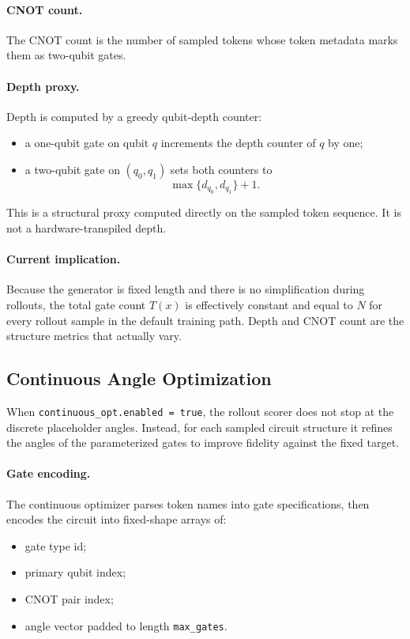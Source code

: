 \documentclass[11pt]{article}
\begin{document}
\paragraph{CNOT count.}
The CNOT count is the number of sampled tokens whose token metadata marks them as two-qubit gates.

\paragraph{Depth proxy.}
Depth is computed by a greedy qubit-depth counter:
\begin{itemize}[leftmargin=*]
\item a one-qubit gate on qubit $q$ increments the depth counter of $q$ by one;
\item a two-qubit gate on $(q_0,q_1)$ sets both counters to
\[
\max\{d_{q_0}, d_{q_1}\} + 1.
\]
\end{itemize}

This is a structural proxy computed directly on the sampled token sequence. It is not a hardware-transpiled depth.

\paragraph{Current implication.}
Because the generator is fixed length and there is no simplification during rollouts, the total gate count $T(x)$ is effectively constant and equal to $N$ for every rollout sample in the default training path. Depth and CNOT count are the structure metrics that actually vary.

\subsection{Continuous Angle Optimization}

When \texttt{continuous\_opt.enabled = true}, the rollout scorer does not stop at the discrete placeholder angles. Instead, for each sampled circuit structure it refines the angles of the parameterized gates to improve fidelity against the fixed target.

\paragraph{Gate encoding.}
The continuous optimizer parses token names into gate specifications, then encodes the circuit into fixed-shape arrays of:
\begin{itemize}[leftmargin=*]
\item gate type id;
\item primary qubit index;
\item CNOT pair index;
\item angle vector padded to length \texttt{max\_gates}.
\end{itemize}
\end{document}
